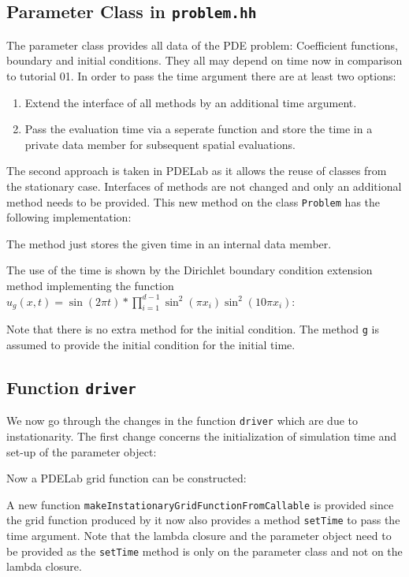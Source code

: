 \documentclass[a4paper,12pt]{article}
\begin{document}
\subsection{Parameter Class in \lstinline{problem.hh}}

The parameter class provides all data of the PDE problem: Coefficient functions,
boundary and initial conditions. They all may depend on time now in comparison to tutorial 01.
In order to pass the time argument there are at least two options:
\begin{enumerate}[1)]
\item Extend the interface of all methods by an additional time
argument.
\item Pass the evaluation time via a seperate function and store the
time in a private data member for subsequent spatial evaluations.
\end{enumerate}
The second approach is taken in PDELab as it allows the reuse
of classes from the stationary case. Interfaces of methods are not changed
and only an additional method needs to be provided.
This new method on the class \lstinline{Problem} has the following implementation:

The method just stores the given time in
an internal data member.

The use of the time is shown by the Dirichlet boundary condition 
extension method implementing the function 
$u_g(x,t) = \sin(2\pi t)*\prod_{i=1}^{d-1} \sin^2(\pi x_i)\sin^2(10\pi x_i)$:

Note that there is no extra method for the initial condition.
The method \lstinline{g} is assumed to provide the initial condition
for the initial time.

\subsection{Function \lstinline{driver}}

We now go through the changes in the function \lstinline{driver} which
are due to instationarity. The first change concerns 
the initialization of simulation time and set-up of the parameter object:


Now a PDELab grid function can be constructed:

A new function \lstinline{makeInstationaryGridFunctionFromCallable}
is provided since the grid function produced by it now also
provides a method \lstinline{setTime} to pass the time argument.
Note that the lambda closure and the parameter object need to be
provided as the \lstinline{setTime} method is only on the parameter class
and not on the lambda closure.
\end{document}
